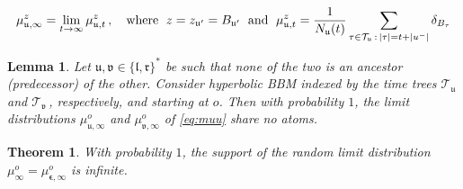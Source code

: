 \documentclass[10pt,a4paper]{amsart}
\newtheorem{lem}{Lemma}
\newtheorem{theorem}{Theorem}
\newcommand\BB{\textit{\textbf{B}}}
\newcommand\T{\mathcal T}
\newcommand\bep{\boldsymbol{\epsilon}}
\newcommand\lt{\mathfrak{l}}
\newcommand\nn{N}
\newcommand\rt{\mathfrak{r}}
\newcommand\ut{\mathfrak{u}}
\newcommand\vt{\mathfrak{v}}
\begin{document}
\begin{equation}\label{eq:muu}
\mu_{\ut, \infty}^{z} %
= \lim_{t \to \infty} \mu_{\ut, t}^{z}\,, \quad \text{where }\; z=z_{\ut'} = \BB_{\ut'}\;\text{ and }\; %
\mu_{\ut, t}^{z} %
= \frac{1}{\nn_{\ut}(t)} \sum_{\tau \in \T_{\ut}\,:\, |\tau| = t+ |u^-|} 
\delta_{\BB_{\tau}}
\end{equation}

\begin{lem}\label{lem:indep}
Let $\ut, \vt \in  \{\lt,\rt\}^*$ be such that none of the two is an ancestor (predecessor) 
of the other.
Consider hyperbolic BBM indexed by the time trees $\T_{\ut}$ and $\T_{\vt}\,$, respectively, and starting at $o$. Then with probability $1$, the limit distributions 
$\mu_{\ut, \infty}^{o}$ and $\mu_{\vt, \infty}^{o}$ of \eqref{eq:muu} share no atoms.
\end{lem}

\begin{theorem}\label{thm:atoms}
With probability $1$, the support of the random limit distribution 
$\mu_{\infty}^{o} = \mu_{\bep, \infty}^{o}$
is infinite.
\end{theorem}
\end{document}
